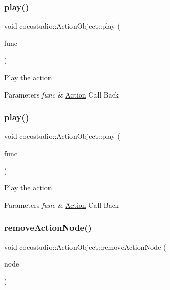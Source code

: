 \subsubsection{\texorpdfstring{play()}{play()}\hspace{0.1cm}{\footnotesize\ttfamily [3/4]}}
{\footnotesize\ttfamily void cocostudio\+::\+Action\+Object\+::play (\begin{DoxyParamCaption}\item[{cocos2d\+::\+Call\+Func $\ast$}]{func }\end{DoxyParamCaption})}

Play the action.


\begin{DoxyParams}{Parameters}
{\em func} & \hyperlink{classAction}{Action} Call Back \\
\hline
\end{DoxyParams}
\mbox{\label{classcocostudio_1_1ActionObject_a2be572de273340713eb91f0393a336ed}} 
\subsubsection{\texorpdfstring{play()}{play()}\hspace{0.1cm}{\footnotesize\ttfamily [4/4]}}
{\footnotesize\ttfamily void cocostudio\+::\+Action\+Object\+::play (\begin{DoxyParamCaption}\item[{cocos2d\+::\+Call\+Func $\ast$}]{func }\end{DoxyParamCaption})}

Play the action.


\begin{DoxyParams}{Parameters}
{\em func} & \hyperlink{classAction}{Action} Call Back \\
\hline
\end{DoxyParams}
\mbox{\label{classcocostudio_1_1ActionObject_a2923d174d80fb1a62749b32fdeb9b056}} 
\subsubsection{\texorpdfstring{remove\+Action\+Node()}{removeActionNode()}\hspace{0.1cm}{\footnotesize\ttfamily [1/2]}}
{\footnotesize\ttfamily void cocostudio\+::\+Action\+Object\+::remove\+Action\+Node (\begin{DoxyParamCaption}\item[{\hyperlink{classcocostudio_1_1ActionNode}{Action\+Node} $\ast$}]{node }\end{DoxyParamCaption})}

